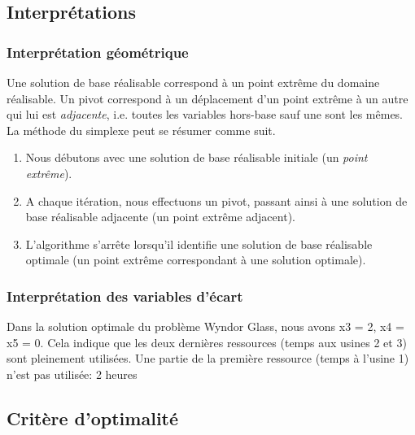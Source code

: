 \subsection{Interprétations}

\subsubsection{Interprétation géométrique}

Une solution de base réalisable correspond à un point extrême du domaine réalisable.
Un pivot correspond à un déplacement d'un point extrême à un autre qui lui est {\sl adjacente}, i.e. toutes les variables hors-base sauf une sont les mêmes.
La méthode du simplexe peut se résumer comme suit.
\begin{enumerate}
\item
Nous débutons avec une solution de base réalisable initiale (un
{\sl point extrême}).
\item
A chaque itération, nous effectuons un pivot, passant ainsi à une
solution de base réalisable adjacente (un point extrême adjacent).
\item
L'algorithme s'arrête lorsqu'il identifie une solution de base réalisable
optimale (un point extrême correspondant à une solution optimale).
\end{enumerate}

\subsubsection{Interprétation des variables d'écart}

\begin{example}
Dans la solution optimale du problème Wyndor Glass, nous avons x3 = 2, x4 = x5 = 0.
Cela indique que les deux dernières ressources (temps aux usines 2 et 3) sont pleinement utilisées.
Une partie de la première ressource (temps à l'usine 1) n'est pas utilisée: 2 heures
\end{example}

\subsection{Critère d'optimalité}

